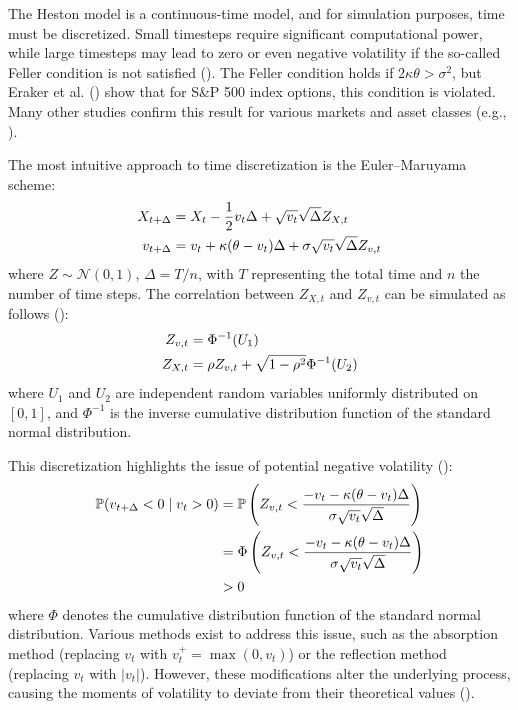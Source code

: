 The Heston model is a continuous-time model, and for simulation purposes, time must be discretized. Small timesteps require significant computational power, while large timesteps may lead to zero or even negative volatility if the so-called Feller condition is not satisfied (\cite{albrecherLittleHestonTrap2007}). The Feller condition holds if $2\kappa\theta > \sigma^2$, but Eraker et al. (\citeyear{erakerImpactJumpsVolatility2003}) show that for S\&P 500 index options, this condition is violated. Many other studies confirm this result for various markets and asset classes (e.g., \cite{changOptionPricingDouble2021,huPricingVolatilityJump2022}).

The most intuitive approach to time discretization is the Euler–Maruyama scheme:
\begin{align}
    X_{t+\Delta} &= X_t - \frac{1}{2}v_t\Delta + \sqrt{v_t}\sqrt{\Delta}Z_{X,t} \notag \\
    v_{t+\Delta} &= v_t + \kappa(\theta - v_t)\Delta + \sigma\sqrt{v_t}\sqrt{\Delta}Z_{v,t} \notag
\end{align}
where $Z \sim \mathcal{N}(0,1)$, $\Delta = T/n$, with $T$ representing the total time and $n$ the number of time steps. The correlation between $Z_{X,t}$ and $Z_{v,t}$ can be simulated as follows (\cite{andersenEfficientSimulationHeston2007}):
\begin{align}
    Z_{v,t} &= \Phi^{-1}(U_1) \notag \\
    Z_{X,t} &= \rho Z_{v,t} + \sqrt{1-\rho^2}\Phi^{-1}(U_2) \notag
\end{align}
where $U_1$ and $U_2$ are independent random variables uniformly distributed on $[0,1]$, and $\Phi^{-1}$ is the inverse cumulative distribution function of the standard normal distribution.

This discretization highlights the issue of potential negative volatility (\cite{okhrinSimulatingCoxIngersoll2022}):
\begin{align}
    \mathbb{P}(v_{t+\Delta}<0 \mid v_t>0) &= \mathbb{P}\left(Z_{v,t} < \frac{-v_t-\kappa(\theta-v_t)\Delta}{\sigma\sqrt{v_t}\sqrt{\Delta}}\right) \notag \\
    &= \Phi\left(Z_{v,t} < \frac{-v_t-\kappa(\theta-v_t)\Delta}{\sigma\sqrt{v_t}\sqrt{\Delta}}\right) \notag \\
    &> 0 \notag
\end{align}
where $\Phi$ denotes the cumulative distribution function of the standard normal distribution. Various methods exist to address this issue, such as the absorption method (replacing $v_t$ with $v_t^+ = \max(0, v_t)$) or the reflection method (replacing $v_t$ with $\vert v_t\vert$). However, these modifications alter the underlying process, causing the moments of volatility to deviate from their theoretical values (\cite{okhrinSimulatingCoxIngersoll2022,tsoskounoglouSimulatingHestonModel2024}).


